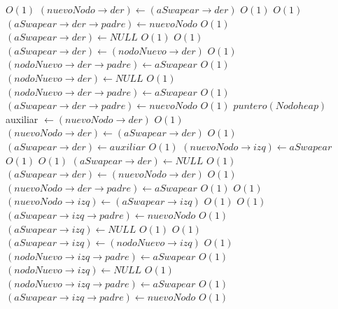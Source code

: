 \begin{Algoritmos}
\begin{algorithmic}[1]
							\EndIf
							 \Comment $O(1)$
								\State $(nuevoNodo \rightarrow der) \gets (aSwapear \rightarrow der)$ \Comment $O(1)$
								 \Comment $O(1)$
								\State $(aSwapear \rightarrow der \rightarrow padre) \gets nuevoNodo$	 \Comment $O(1)$						
								\EndIf
								\State $(aSwapear \rightarrow der) \gets NULL$ \Comment $O(1)$
							\Else
								 \Comment $O(1)$
									\State $(aSwapear \rightarrow der) \gets (nodoNuevo \rightarrow der)$ \Comment $O(1)$
									\State $(nodoNuevo \rightarrow der \rightarrow padre) \gets aSwapear$ \Comment $O(1)$
									\State $(nodoNuevo \rightarrow der) \gets NULL$ \Comment $O(1)$
								\Else
									\State $(nodoNuevo \rightarrow der \rightarrow padre) \gets aSwapear$ \Comment $O(1)$
									\State $(aSwapear \rightarrow der \rightarrow padre) \gets nuevoNodo$ \Comment $O(1)$
									\State $puntero(Nodoheap)$ auxiliar $\gets (nuevoNodo \rightarrow der)$ \Comment $O(1)$
									\State $(nuevoNodo \rightarrow der) \gets (aSwapear \rightarrow der)$ \Comment $O(1)$
									\State $(aSwapear \rightarrow der) \gets auxiliar$ \Comment $O(1)$
								\EndIf
							\EndIf
						\State $(nuevoNodo \rightarrow izq) \gets aSwapear$ \Comment $O(1)$
					\Else
						 \Comment $O(1)$
								\State $(aSwapear \rightarrow der) \gets NULL$ \Comment $O(1)$
							\Else
								\State $(aSwapear \rightarrow der) \gets (nuevoNodo \rightarrow der)$ \Comment $O(1)$
								\State $(nuevoNodo \rightarrow der \rightarrow padre) \gets aSwapear$ \Comment $O(1)$
							\EndIf
							 \Comment $O(1)$
								\State $(nuevoNodo \rightarrow izq) \gets (aSwapear \rightarrow izq)$ \Comment $O(1)$
								 \Comment $O(1)$
									\State $(aSwapear \rightarrow izq \rightarrow padre) \gets nuevoNodo$	\Comment $O(1)$						
								\EndIf
								\State $(aSwapear \rightarrow izq) \gets NULL$ \Comment $O(1)$
							\Else
								 \Comment $O(1)$
									\State $(aSwapear \rightarrow izq) \gets (nodoNuevo \rightarrow izq)$ \Comment $O(1)$
									\State $(nodoNuevo \rightarrow izq \rightarrow padre) \gets aSwapear$ \Comment $O(1)$
									\State $(nodoNuevo \rightarrow izq) \gets NULL$ \Comment $O(1)$
								\Else
									\State $(nodoNuevo \rightarrow izq \rightarrow padre) \gets aSwapear$ \Comment $O(1)$
									\State $(aSwapear \rightarrow izq \rightarrow padre) \gets nuevoNodo$ \Comment $O(1)$

\end{algorithmic}
\end{Algoritmos}
